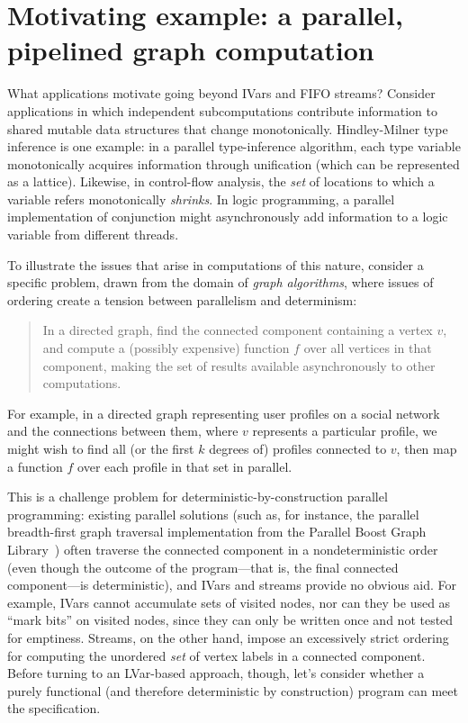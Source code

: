 \section{Motivating example: a parallel, pipelined graph computation}\label{s:lvars-motivation}

What applications motivate going beyond IVars and FIFO streams?
Consider applications in which independent subcomputations contribute
information to shared mutable data structures that change
monotonically.  Hindley-Milner type inference is one example: in a
parallel type-inference algorithm, each type variable monotonically
acquires information through unification (which can be represented as
a lattice). Likewise, in control-flow analysis, the \emph{set} of
locations to which a variable refers monotonically \emph{shrinks}.  In
logic programming, a parallel implementation of conjunction might
asynchronously add information to a logic variable from different
threads.

To illustrate the issues that arise in computations of this nature,
consider a specific problem, drawn from the domain of \emph{graph
  algorithms}, where issues of ordering create a tension between
parallelism and determinism:
\begin{quote}
  In a directed graph, find the connected component containing a
  vertex $v$, and compute a (possibly expensive) function $f$ over all
  vertices in that component, making the set of results available
  asynchronously to other computations.
\end{quote}
For example, in a directed graph representing user profiles on a
social network and the connections between them, where $v$ represents
a particular profile, we might wish to find all (or the first $k$
degrees of) profiles connected to $v$, then map a function $f$ over
each profile in that set in parallel.

This is a challenge problem for deterministic-by-construction parallel
programming: existing parallel solutions (such as, for instance, the
parallel breadth-first graph traversal implementation from the
Parallel Boost Graph Library~\cite{bfs-pbgl}) often traverse the
connected component in a nondeterministic order (even though the
outcome of the program---that is, the final connected component---is
deterministic), and IVars and streams provide no obvious aid.  For
example, IVars cannot accumulate sets of visited nodes, nor can they
be used as ``mark bits'' on visited nodes, since they can only be
written once and not tested for emptiness.  Streams, on the other
hand, impose an excessively strict ordering for computing the
unordered \emph{set} of vertex labels in a connected component.
Before turning to an LVar-based approach, though, let's consider
whether a purely functional (and therefore deterministic by
construction) program can meet the specification.

